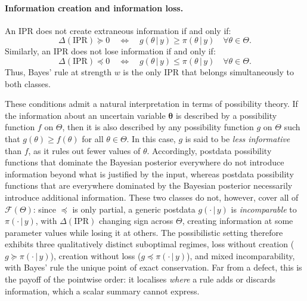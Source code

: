\documentclass[accepted]{uai2026} %
\def\given{\,|\,}
\theoremstyle{remark}
\begin{document}
\paragraph{Information creation and information loss.} An IPR does not create extraneous information if and only if: 
\[ \Delta(\text{IPR}) \succeq 0 \quad \Longleftrightarrow \quad g(\theta \given y) \ge \pi
(\theta \given y) \quad \forall \theta \in \Theta. 
\]
Similarly, an IPR does not lose information if and only if: 
\[ \Delta(\text{IPR}) \preceq 0 \quad \Longleftrightarrow \quad g(\theta \given y) \le \pi
(\theta \given y) \quad \forall \theta \in \Theta. 
\]
Thus, Bayes' rule at strength $w$ is the only IPR that belongs simultaneously to both classes. 

These conditions admit a natural interpretation in terms of possibility theory. If the information about an uncertain variable $\boldsymbol{\theta}$ is described by a possibility function $f$ on $\Theta$, then it is also described by any possibility function $g$ on $\Theta$ such that $g(\theta) \ge f(\theta)$ for all $\theta \in \Theta$. In this case, $g$ is said to be \emph{less informative} than $f$, as it rules out fewer values of $\theta$. Accordingly, postdata possibility functions that dominate the Bayesian posterior everywhere do not introduce information beyond what is justified by the input, whereas postdata possibility functions that are everywhere dominated by the Bayesian posterior necessarily introduce additional information. These two classes do not, however, cover all of $\mathcal{F}(\Theta)$: since $\preceq$ is only partial, a generic postdata $g(\cdot\given y)$ is \emph{incomparable} to $\pi(\cdot\given y)$, with $\Delta(\text{IPR})$ changing sign across $\Theta$, creating information at some parameter values while losing it at others. The possibilistic setting therefore exhibits three qualitatively distinct suboptimal regimes, loss without creation ($g\succeq\pi(\cdot\given y)$), creation without loss ($g\preceq\pi(\cdot\given y)$), and mixed incomparability, with Bayes' rule the unique point of exact conservation. Far from a defect, this is the payoff of the pointwise order: it localises \emph{where} a rule adds or discards information, which a scalar summary cannot express.
\end{document}
